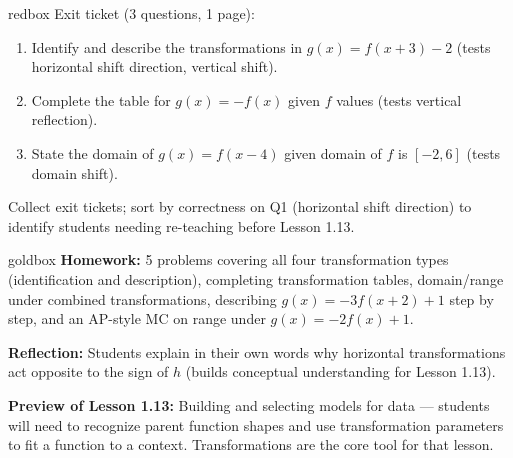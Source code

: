 \documentclass[10pt]{article}
\begin{document}
\begin{skillbox}{redbox}
Exit ticket (3 questions, 1 page):
\begin{enumerate}[leftmargin=1.2em,itemsep=2pt,topsep=0pt]
  \item Identify and describe the transformations in $g(x)=f(x+3)-2$ (tests horizontal shift direction, vertical shift).
  \item Complete the table for $g(x)=-f(x)$ given $f$ values (tests vertical reflection).
  \item State the domain of $g(x)=f(x-4)$ given domain of $f$ is $[-2,6]$ (tests domain shift).
\end{enumerate}
Collect exit tickets; sort by correctness on Q1 (horizontal shift direction) to identify students needing re-teaching before Lesson 1.13.
\end{skillbox}

\begin{skillbox}{goldbox}
\textbf{Homework:} 5 problems covering all four transformation types (identification and description),
completing transformation tables, domain/range under combined transformations, describing $g(x)=-3f(x+2)+1$
step by step, and an AP-style MC on range under $g(x)=-2f(x)+1$.

\textbf{Reflection:} Students explain in their own words why horizontal transformations act opposite
to the sign of $h$ (builds conceptual understanding for Lesson 1.13).

\textbf{Preview of Lesson 1.13:} Building and selecting models for data --- students will need to
recognize parent function shapes and use transformation parameters to fit a function to a context.
Transformations are the core tool for that lesson.
\end{skillbox}
\end{document}
